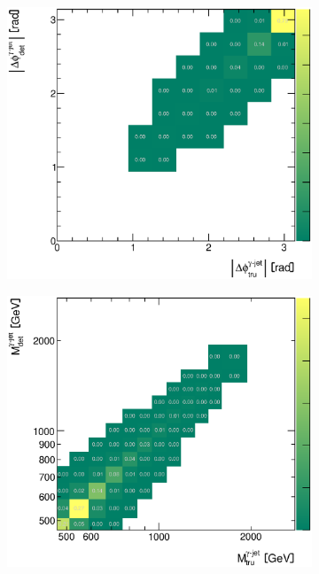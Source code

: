 \documentclass[12pt, twoside]{article}
\numberwithin{equation}{section}
\numberwithin{figure}{section}
\newenvironment{changemargin}[2]{%
\begin{list}{}{%
\setlength{\topsep}{0pt}%
\setlength{\leftmargin}{#1}%
\setlength{\rightmargin}{#2}%
\setlength{\listparindent}{\parindent}%
\setlength{\itemindent}{\parindent}%
\setlength{\parsep}{\parskip}%
}%
\item[]}{\end{list}}
\begin{document}
\begin{figure}
\begin{changemargin}{-1.0cm}{-0.75cm}
\begin{changemargin}{-0.75cm}{-1.0cm}
        \vspace{0.2cm}
        \begin{subfigure}[b]{0.37\textwidth}
            \includegraphics[width=\textwidth]{./images/CorrelationMatricesPythia/REC_vs_HAD(DP+FP)-107.eps}
            \subcaption{}
            \label{fig:PythiaCorrelationPhiPhotonJet}
        \end{subfigure}
        \begin{subfigure}[b]{0.37\textwidth}
            \includegraphics[width=\textwidth]{./images/CorrelationMatricesPythia/REC_vs_HAD(DP+FP)-108.eps}

\end{subfigure}
\end{changemargin}
\end{changemargin}
\end{figure}
\end{document}
